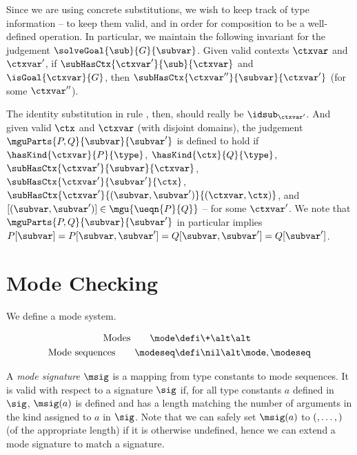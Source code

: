 
Since we are using concrete substitutions, we wish to keep track of type information -- to keep them valid, and in order for composition to be a well-defined operation.
In particular, we maintain the following invariant for the judgement $\solveGoal{\sub}{G}{\subvar}$.
Given valid contexts $\ctxvar$ and $\ctxvar'$, if $\subHasCtx{\ctxvar'}{\sub}{\ctxvar}$ and $\isGoal{\ctxvar}{G}$, then $\subHasCtx{\ctxvar''}{\subvar}{\ctxvar'}$ (for some $\ctxvar''$).

The identity substitution in rule , then, should really be $\idsub_{\ctxvar'}$.
And given valid $\ctx$ and $\ctxvar$ (with disjoint domains), the judgement ${\mguParts{P, Q}{\subvar}{\subvar'}}$ %
is defined to hold if $\hasKind{\ctxvar}{P}{\type}$, $\hasKind{\ctx}{Q}{\type}$, $\subHasCtx{\ctxvar'}{\subvar}{\ctxvar}$, $\subHasCtx{\ctxvar'}{\subvar'}{\ctx}$, $\subHasCtx{\ctxvar'}{(\subvar, \subvar')}{(\ctxvar, \ctx)}$, and $[(\subvar, \subvar')] \in \mgu{\ueqn{P}{Q}}$ -- for some $\ctxvar'$.
We note that $\mguParts{P, Q}{\subvar}{\subvar'}$ in particular implies $P[\subvar] = P[\subvar, \subvar'] = Q[\subvar, \subvar'] = Q[\subvar']$.

\section*{Mode Checking}

We define a mode system.

\begin{align*}
\text{Modes} \qquad \mode &\defi \+ \alt \- \alt \* \\
\text{Mode sequences} \qquad \modeseq &\defi \nil \alt \mode, \modeseq
\end{align*}

A \textit{mode signature} $\msig$ is a mapping from type constants to mode sequences.
It is valid with respect to a signature $\sig$ if, for all type constants $a$ defined in $\sig$, $\msig(a)$ is defined and has a length matching the number of arguments in the kind assigned to $a$ in $\sig$.
Note that we can safely set $\msig(a)$ to $(\*, \ldots, \*)$ (of the appropriate length) if it is otherwise undefined, hence we can extend a mode signature to match a signature.

